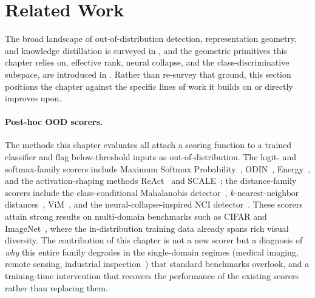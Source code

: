 \section{Related Work}
\label{sec:dsc:related}

The broad landscape of out-of-distribution detection, representation geometry, and knowledge distillation is surveyed in , and the geometric primitives this chapter relies on, effective rank, neural collapse, and the class-discriminative subspace, are introduced in . Rather than re-survey that ground, this section positions the chapter against the specific lines of work it builds on or directly improves upon.

\paragraph{Post-hoc OOD scorers.}
The methods this chapter evaluates all attach a scoring function to a trained classifier and flag below-threshold inputs as out-of-distribution. The logit- and softmax-family scorers include Maximum Softmax Probability~\citep{hendrycks2016baseline}, ODIN~\citep{liang2017enhancing}, Energy~\citep{liu2020energy}, and the activation-shaping methods ReAct~\citep{sun2021react} and SCALE~\citep{xuscaling}; the distance-family scorers include the class-conditional Mahalanobis detector~\citep{lee2018simple}, $k$-nearest-neighbor distances~\citep{sun2022out}, ViM~\citep{Wang2022vim}, and the neural-collapse-inspired NCI detector~\citep{liu2025detecting}. These scorers attain strong results on multi-domain benchmarks such as CIFAR and ImageNet~\citep{yang2022openood,yang2021generalized}, where the in-distribution training data already spans rich visual diversity. The contribution of this chapter is not a new scorer but a diagnosis of \emph{why} this entire family degrades in the single-domain regimes (medical imaging, remote sensing, industrial inspection~\citep{cao2020benchmark,Berger2021medood}) that standard benchmarks overlook, and a training-time intervention that recovers the performance of the existing scorers rather than replacing them.

